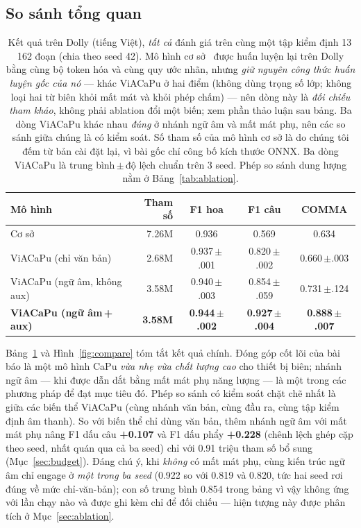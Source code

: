 \documentclass[conference,onecolumn]{IEEEtran}
\begin{document}
\subsection{So sánh tổng quan}

\begin{table}[htbp]
\caption{Kết quả trên Dolly (tiếng Việt), \emph{tất cả} đánh giá trên cùng một tập
kiểm định 13\,162 đoạn (chia theo seed 42). Mô hình cơ sở~\cite{you2024lightweight}
được huấn luyện lại trên Dolly bằng cùng bộ token hóa và cùng quy ước nhãn, nhưng
\emph{giữ nguyên công thức huấn luyện gốc của nó} --- khác ViACaPu ở hai điểm
(không dùng trọng số lớp; không loại hai từ biên khỏi mất mát và khỏi phép chấm)
--- nên dòng này là \emph{đối chiếu tham khảo}, không phải ablation đổi một biến;
xem phần thảo luận sau bảng. Ba dòng ViACaPu khác nhau \emph{đúng} ở nhánh ngữ âm
và mất mát phụ, nên các so sánh giữa chúng là có kiểm soát. Số tham số của mô hình
cơ sở là do chúng tôi đếm từ bản cài đặt lại, vì bài gốc chỉ công bố kích thước
ONNX. Ba dòng ViACaPu là trung bình\,$\pm$\,độ lệch chuẩn trên 3 seed. Phép so
sánh dung lượng nằm ở Bảng~\ref{tab:ablation}.}
\label{tab:main}
\centering
\setlength{\tabcolsep}{6pt}
\begin{tabular}{lrccc}
\toprule
Mô hình & Tham số & F1 hoa & F1 câu & COMMA \\
\midrule
Cơ sở~\cite{you2024lightweight}      & 7.26M & 0.936 & 0.569 & 0.634 \\
ViACaPu (chỉ văn bản)                & 2.68M & 0.937\,\tiny$\pm$.001 & 0.820\,\tiny$\pm$.002 & 0.660\,\tiny$\pm$.003 \\
ViACaPu (ngữ âm, không aux)          & 3.58M & 0.940\,\tiny$\pm$.003 & 0.854\,\tiny$\pm$.059 & 0.731\,\tiny$\pm$.124 \\
\textbf{ViACaPu (ngữ âm\,+\,aux)}    & \textbf{3.58M} & \textbf{0.944\,\tiny$\pm$.002} & \textbf{0.927\,\tiny$\pm$.004} & \textbf{0.888\,\tiny$\pm$.007} \\
\bottomrule
\end{tabular}
\end{table}

Bảng~\ref{tab:main} và Hình~\ref{fig:compare} tóm tắt kết quả chính. Đóng góp cốt
lõi của bài báo là một mô hình CaPu \emph{vừa nhẹ vừa chất lượng cao} cho thiết bị
biên; nhánh ngữ âm --- khi được dẫn dắt bằng mất mát phụ năng lượng --- là một
trong các phương pháp để đạt mục tiêu đó. Phép so sánh có kiểm soát chặt chẽ nhất
là giữa các biến thể ViACaPu (cùng nhánh văn bản, cùng đầu ra, cùng tập kiểm định
âm thanh). So với biến thể chỉ dùng văn bản, thêm nhánh ngữ âm với mất mát phụ nâng
F1 dấu câu \textbf{+0.107} và F1 dấu phẩy \textbf{+0.228} (chênh lệch ghép cặp theo
seed, nhất quán qua cả ba seed) chỉ với 0.91 triệu tham số bổ sung (Mục~\ref{sec:budget}). Đáng chú ý, khi
\emph{không} có mất mát phụ, cùng kiến trúc ngữ âm chỉ engage ở \emph{một trong
ba seed} (0.922 so với 0.819 và 0.820, tức hai seed rơi đúng về mức chỉ-văn-bản);
con số trung bình 0.854 trong bảng vì vậy không ứng với lần chạy nào và được ghi
kèm chỉ để đối chiếu --- hiện tượng này được phân tích ở Mục~\ref{sec:ablation}.
\end{document}
